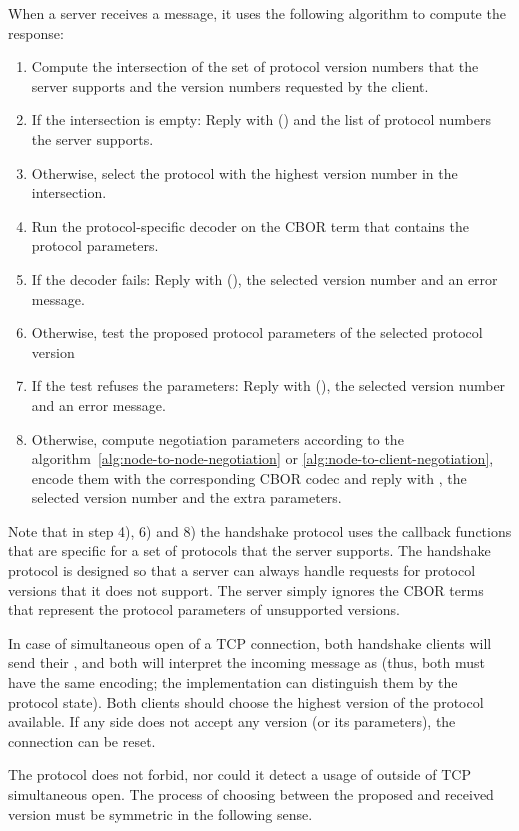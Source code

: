 When a server receives a \MsgProposeVersions{} message, it uses the following algorithm to
compute the response:
\begin{enumerate}
\item
  Compute the intersection of the set of protocol version numbers that the server supports
  and the version numbers requested by the client.
\item
  If the intersection is empty:
  Reply with \MsgRefuse(\VersionMismatch) and the list of protocol numbers the server supports.
\item
  Otherwise, select the protocol with the highest version number in the
    intersection.
\item
  Run the protocol-specific decoder on the CBOR term that contains the protocol parameters.
\item
  If the decoder fails:
  Reply with \MsgRefuse(\HandshakeDecodeError), the selected version number and an error message.
\item
  Otherwise, test the proposed protocol parameters of the selected protocol version
\item
  If the test refuses the parameters:
    Reply with \MsgRefuse(\Refused), the selected version number and an error message.
\item
  Otherwise, compute negotiation parameters according to the
    algorithm~\ref{alg:node-to-node-negotiation} or
    \ref{alg:node-to-client-negotiation}, encode them with the corresponding
    CBOR codec and reply with \MsgAcceptVersion, the selected version number
    and the extra parameters.
\end{enumerate}
Note that in step 4), 6) and 8) the handshake protocol uses the callback functions that are specific
for a set of protocols that the server supports.
The handshake protocol is designed
so that a server can always handle requests for protocol versions that it does not support.
The server simply ignores the CBOR terms that represent the protocol parameters of unsupported
versions.

In case of simultaneous open of a TCP connection, both handshake clients will
send their \MsgProposeVersions{}, and both will interpret the incoming message as
\MsgReplyVersions{} (thus, both must have the same encoding; the implementation
can distinguish them by the protocol state).  Both clients should choose the
highest version of the protocol available.  If any side does not accept any
version (or its parameters), the connection can be reset.

The protocol does not forbid, nor could it detect a usage of
\MsgReplyVersions{} outside of TCP simultaneous open.  The process of
choosing between the proposed and received version must be symmetric in the
following sense.

